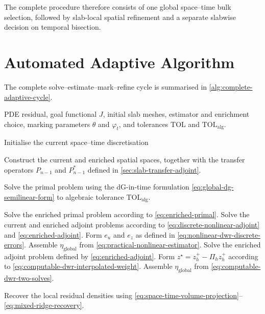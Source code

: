 The complete procedure therefore consists of one global space--time bulk selection, followed by slab-local spatial refinement and a separate slabwise decision on temporal bisection.



\section{Automated Adaptive Algorithm}

The complete solve--estimate--mark--refine cycle is summarised in \cref{alg:complete-adaptive-cycle}.

\begin{algorithm}[!htbp]
\caption{Goal-oriented slabwise space--time adaptive cycle}
\label{alg:complete-adaptive-cycle}
\begin{algorithmic}[1]
\Require PDE residual, goal functional \(J\), initial slab meshes, estimator and enrichment choice, marking parameters \(\theta\) and \(\varphi_t\), and tolerances $\mathrm{TOL}$ and $\mathrm{TOL}_{\mathrm{alg}}$.

\State Initialise the current space--time discretisation

  \State Construct the current and enriched spatial spaces, together with the transfer operators \(P_{n-1}\) and \(P_{n-1}^{\ast}\) defined in \cref{sec:slab-transfer-adjoint}.
  
  \State Solve the primal problem using the dG-in-time formulation \eqref{eq:global-dg-semilinear-form} to algebraic
  tolerance \(\mathrm{TOL}_{\mathrm{alg}}\).

    \State Solve the enriched primal problem according to \eqref{eq:enriched-primal}.
    \State Solve the current and enriched adjoint problems according to \eqref{eq:discrete-nonlinear-adjoint} and \eqref{eq:enriched-adjoint}.
    \State Form \(e_u\) and \(e_z\) as defined in \eqref{eq:nonlinear-dwr-discrete-errors}.
    \State Assemble \(\eta_{\mathrm{global}}\) from \eqref{eq:practical-nonlinear-estimator}.
  \Else
  \State Solve the enriched adjoint problem defined by \eqref{eq:enriched-adjoint}. 
  \State Form \(z^\star=z_h^+-\Pi_{h}z_h^+\) according to \eqref{eq:computable-dwr-interpolated-weight}.
    \State Assemble \(\eta_{\mathrm{global}}\) from \eqref{eq:computable-dwr-two-solves}.
  \EndIf
  
  \State Recover the local residual densities using \eqref{eq:space-time-volume-projection}--\eqref{eq:mixed-ridge-recovery}.
  

\end{algorithmic}
\end{algorithm}
